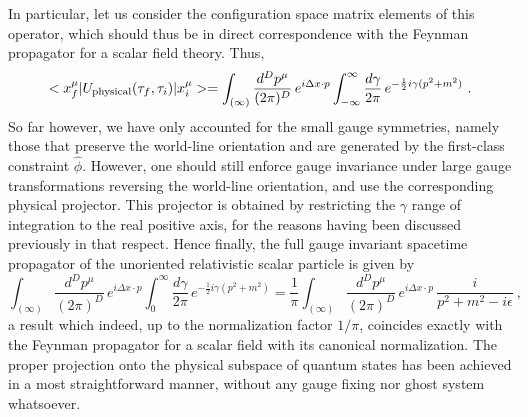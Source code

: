 \documentclass[a4paper,11pt]{article}
\begin{document}
In particular, let us consider the configuration space matrix elements of 
this operator, which should thus be in direct correspondence with the
Feynman propagator for a scalar field theory. Thus,
\begin{equation}
<x^\mu_f|U_{\rm physical}(\tau_f,\tau_i)|x^\mu_i>=
\int_{(\infty)}\frac{d^Dp^\mu}{(2\pi)^D}\,e^{i\Delta x\cdot p}
\int_{-\infty}^\infty\frac{d\gamma}{2\pi}\,
e^{-\frac{1}{2}i\gamma(p^2+m^2)}\ .
\end{equation}
So far however, we have only accounted for the small gauge symmetries,
namely those that preserve the world-line orientation and are generated
by the first-class constraint $\hat{\phi}$. However, one should still
enforce gauge invariance under large gauge transformations reversing
the world-line orientation, and use the corresponding physical projector.
This projector is obtained by restricting the $\gamma$ range of integration
to the real positive axis, for the reasons having been discussed previously 
in that respect. Hence finally, the full gauge invariant spacetime propagator 
of the unoriented relativistic scalar particle is given by
\begin{equation}
\int_{(\infty)}\frac{d^Dp^\mu}{(2\pi)^D}\,e^{i\Delta x\cdot p}
\int_0^\infty\frac{d\gamma}{2\pi}\,e^{-\frac{1}{2}i\gamma(p^2+m^2)}=
\frac{1}{\pi}\int_{(\infty)}\frac{d^Dp^\mu}{(2\pi)^D}\,
e^{i\Delta x\cdot p}\,\frac{i}{p^2+m^2-i\epsilon}\ ,
\end{equation}
a result which indeed, up to the normalization factor $1/\pi$, coincides
exactly with the Feynman propagator for a scalar field with its
canonical normalization. The proper projection onto the physical subspace
of quantum states has been achieved in a most straightforward manner,
without any gauge fixing nor ghost system whatsoever.\cite{JG6}
\end{document}
